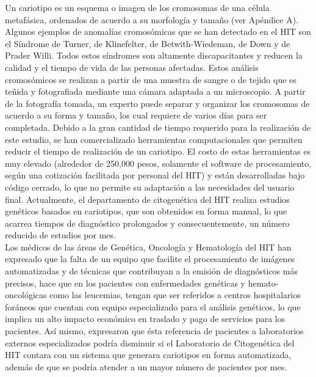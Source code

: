 \documentclass[12pt,letterpaper,titlepage]{article}
\begin{document}
Un cariotipo es un esquema o imagen de los cromosomas de una célula metafásica, ordenados de acuerdo a su morfología y tamaño (ver Apéndice A). Algunos ejemplos de anomalías cromosómicas que se han detectado en el HIT son el Síndrome de Turner, de Klinefelter, de Betwith-Wiedeman, de Down y de Prader Willi. Todos estos síndromes son altamente discapacitantes y reducen la calidad y el tiempo de vida de las personas afectadas. Estos análisis cromosómicos se realizan a partir de una muestra de sangre o de tejido que es teñida y fotografiada mediante una cámara adaptada a un microscopio. A partir de la fotografía tomada, un experto puede separar y organizar los cromosomas de acuerdo a su forma y tamaño, los cual requiere de varios días para ser completada. Debido a la gran cantidad de tiempo requerido para la realización de este estudio, se han comercializado herramientas computacionales que permiten reducir el tiempo de realización de un cariotipo. El costo de estas herramientas es muy elevado (alrededor de 250,000 pesos, solamente el software de procesamiento, según una cotización facilitada por personal del HIT) y están desarrolladas bajo código cerrado, lo que no permite su adaptación a las necesidades del usuario final. Actualmente, el departamento de citogenética del HIT realiza estudios genéticos basados en cariotipos, que son obtenidos en forma manual, lo que acarrea tiempos de diagnóstico prolongados y consecuentemente, un número reducido de estudios por mes. \\
Los médicos de las áreas de Genética, Oncología y Hematología del HIT han expresado que la falta de un equipo que facilite el procesamiento de imágenes automatizadas y de técnicas que contribuyan a la emisión de diagnósticos más precisos, hace que en los pacientes con enfermedades genéticas y hemato-oncológicas como las leucemias, tengan que ser referidos a centros hospitalarios foráneos que cuentan con equipo especializado para el análisis genéticos, lo que implica un alto impacto económico en traslado y pago de servicios para los pacientes. Así mismo, expresaron que ésta referencia de pacientes a laboratorios externos especializados podría disminuir si el Laboratorio de Citogenética del HIT contara con un sistema que generara cariotipos en forma automatizada, además de que se podría atender a un mayor número de pacientes por mes. \\
\end{document}
